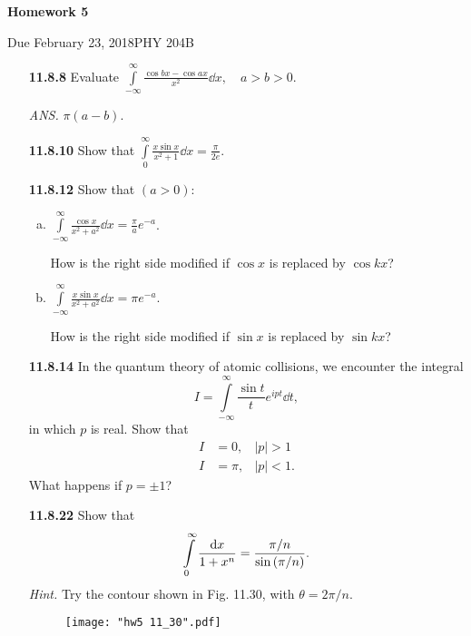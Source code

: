 \documentclass{article}
\newcommand{\Title}     {Homework 5}
\newcommand{\DueDate}   {February 23, 2018}
\newcommand{\Course}    {PHY 204B}
\begin{document}
{\huge\textbf{\Title}}

Due \DueDate \hfill \Course

\hrulefill

\begin{enumerate}
    \item [\textbf{11.8.8}] Evaluate $\displaystyle\int\limits_{-\infty}^\infty \frac{\cos bx - \cos ax}{x^2}\dd{x},\quad a>b>0$.

    \hfill \textit{ANS. } $\pi(a-b).$

    \item [\textbf{11.8.10}] Show that $\displaystyle\int\limits_0^\infty \frac{x\sin x}{x^2 + 1}\dd{x} = \frac{\pi}{2e}$.

    \item [\textbf{11.8.12}] Show that $(a>0)$:
    \begin{enumerate}[(a)]
        \item $\displaystyle\int\limits_{-\infty}^{\infty}\frac{\cos x}{x^2+a^2}\dd{x} = \frac{\pi}{a}e^{-a}$.

        How is the right side modified if $\cos x$ is replaced by $\cos kx$?

        \item $\displaystyle\int\limits_{-\infty}^{\infty}\frac{x\sin x}{x^2+a^2}\dd{x} = \pi e^{-a}$.

        How is the right side modified if $\sin x$ is replaced by $\sin kx$?
    \end{enumerate}

    \item [\textbf{11.8.14}] In the quantum theory of atomic collisions, we encounter the integral
    \[
        I = \int\limits_{-\infty}^\infty \frac{\sin t}{t}e^{ipt}\dd{t},
    \]
    in which $p$ is real. Show that
    \[
    \begin{aligned}
        I &= 0, &|p|>1\phantom{.} \\
        I &= \pi, &|p|<1.
    \end{aligned}
    \]
    What happens if $p=\pm 1$?

    \newpage
    \item [\textbf{11.8.22}] Show that
    \[
        \int\limits_0^\infty \frac{\dd{x}}{1+x^n} = \frac{\pi/n}{\sin\pqty{\pi/n}}.
    \]
    \textit{Hint.} Try the contour shown in Fig. 11.30, with $\theta=2\pi/n$.
    \begin{figure}[H]
    \centering
    \texttt{[image: "hw5 11\_30".pdf]}
    \end{figure}


\end{enumerate}
\end{document}
